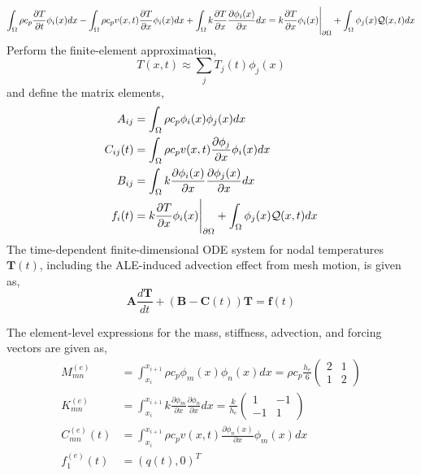 \begin{equation}
    \int_{\Omega}\rho c_p\frac{\partial T}{\partial t}\phi_i(x)dx - \int_{\Omega}\rho c_p v(x,t)\frac{\partial T}{\partial x}\phi_i(x)dx + \int_{\Omega} k\frac{\partial T}{\partial x}\frac{\partial\phi_i(x)}{\partial x} dx = k\frac{\partial T}{\partial x}\phi_i(x)\Bigg|_{\partial\Omega} + \int_{\Omega}\phi_j(x)\mathcal{Q}(x,t)dx
\end{equation}
Perform the finite-element approximation,
\begin{equation}
    T(x,t)\approx\sum_jT_j(t)\phi_j(x)
\end{equation}
and define the matrix elements,
\begin{align}
    A_{ij} &= \int_{\Omega}\rho c_p\phi_i(x)\phi_j(x)dx\\
    C_{ij}(t) &= \int_{\Omega}\rho c_p v(x,t) \frac{\partial\phi_j}{\partial x}\phi_i(x)dx\\
    B_{ij} &= \int_{\Omega}k\frac{\partial\phi_i(x)}{\partial x}\frac{\partial\phi_j(x)}{\partial x}dx\\
    f_i(t) &= k\frac{\partial T}{\partial x}\phi_i(x)\Bigg|_{\partial\Omega} + \int_{\Omega}\phi_j(x)\mathcal{Q}(x,t)dx
\end{align}
The time-dependent finite-dimensional ODE system for nodal temperatures $\mathbf{T}(t)$, including the ALE-induced advection effect from mesh motion, is given as,
\begin{equation}
    \mathbf{A}\frac{d\mathbf{T}}{dt} + \left(\mathbf{B} - \mathbf{C}(t)\right)\mathbf{T} = \mathbf{f}(t)
\end{equation}

The element-level expressions for the mass, stiffness, advection, and forcing vectors are given as,
\begin{align}
    M^{(e)}_{mn} &= \int_{x_i}^{x_{i+1}}\rho c_p\phi_m(x)\phi_n(x)dx = \rho c_p \frac{h_e}{6}\begin{pmatrix}
        2 & 1 \\ 1 & 2
    \end{pmatrix}\\
    K^{(e)}_{mn} &= \int_{x_i}^{x_{i+1}} k \frac{\partial \phi_m}{\partial x}\frac{\partial \phi_n}{\partial x} dx = \frac{k}{h_e}\begin{pmatrix}
        1 & -1 \\ -1 & 1
    \end{pmatrix}\\
    C^{(e)}_{mn}(t) &= \int_{x_i}^{x_{i+1}}\rho c_p v(x,t) \frac{\partial \phi_n(x)}{\partial x}\phi_m(x) dx\\
    f^{(e)}_1(t) &= \left(q(t),0\right)^T
\end{align}